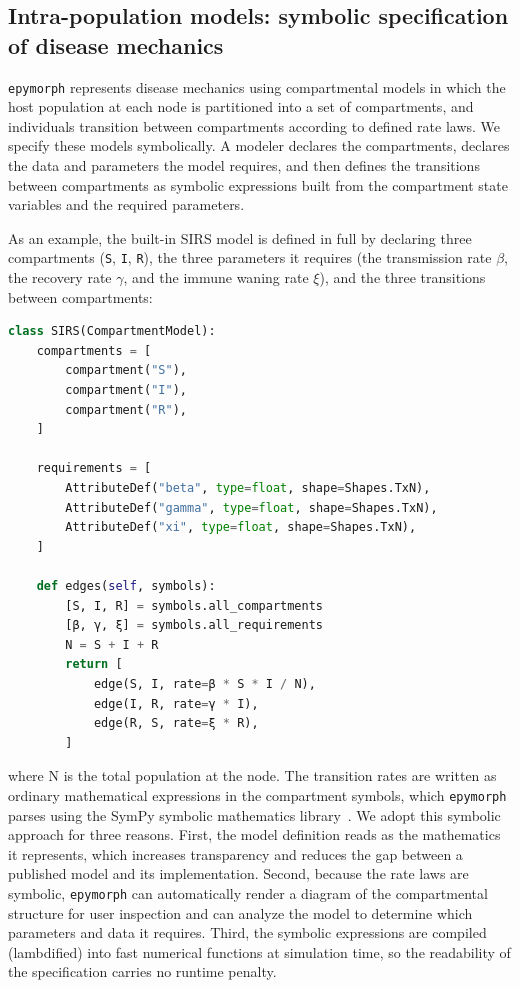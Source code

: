 \subsection{Intra-population models: symbolic specification of disease mechanics}

\texttt{epymorph} represents disease mechanics using compartmental models in which the host
population at each node is partitioned into a set of compartments, and individuals
transition between compartments according to defined rate laws. We specify these models
symbolically. A modeler declares the compartments, declares the data and parameters the
model requires, and then defines the transitions between compartments as symbolic
expressions built from the compartment state variables and the required parameters.

As an example, the built-in SIRS model is defined in full by declaring three compartments
(\texttt{S}, \texttt{I}, \texttt{R}), the three parameters it requires (the transmission
rate $\beta$, the recovery rate $\gamma$, and the immune waning rate $\xi$), and the three transitions
between compartments:

\begin{lstlisting}[language=Python]
class SIRS(CompartmentModel):
    compartments = [
        compartment("S"),
        compartment("I"),
        compartment("R"),
    ]

    requirements = [
        AttributeDef("beta", type=float, shape=Shapes.TxN),
        AttributeDef("gamma", type=float, shape=Shapes.TxN),
        AttributeDef("xi", type=float, shape=Shapes.TxN),
    ]

    def edges(self, symbols):
        [S, I, R] = symbols.all_compartments
        [β, γ, ξ] = symbols.all_requirements
        N = S + I + R
        return [
            edge(S, I, rate=β * S * I / N),
            edge(I, R, rate=γ * I),
            edge(R, S, rate=ξ * R),
        ]
\end{lstlisting}

where N is the total population at the node. The transition rates are written as ordinary
mathematical expressions in the compartment symbols, which \texttt{epymorph} parses using
the SymPy symbolic mathematics library~\citep{meurer_sympy_2017}. We adopt this symbolic approach for three
reasons. First, the model definition reads as the mathematics it represents, which increases
transparency and reduces the gap between a published model and its implementation. Second,
because the rate laws are symbolic, \texttt{epymorph} can automatically render a diagram of
the compartmental structure for user inspection and can analyze the model to determine which
parameters and data it requires. Third, the symbolic expressions are compiled (lambdified)
into fast numerical functions at simulation time, so the readability of the specification
carries no runtime penalty.

